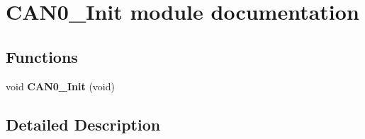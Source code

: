 \hypertarget{group___c_a_n0___init__module}{}\section{C\+A\+N0\+\_\+\+Init module documentation}
\label{group___c_a_n0___init__module}
\subsection*{Functions}
\begin{DoxyCompactItemize}
\item 
void {\bfseries C\+A\+N0\+\_\+\+Init} (void)\hypertarget{group___c_a_n0___init__module_ga0f606fcd8528b15044ed48fd50376fed}{}\label{group___c_a_n0___init__module_ga0f606fcd8528b15044ed48fd50376fed}

\end{DoxyCompactItemize}


\subsection{Detailed Description}
